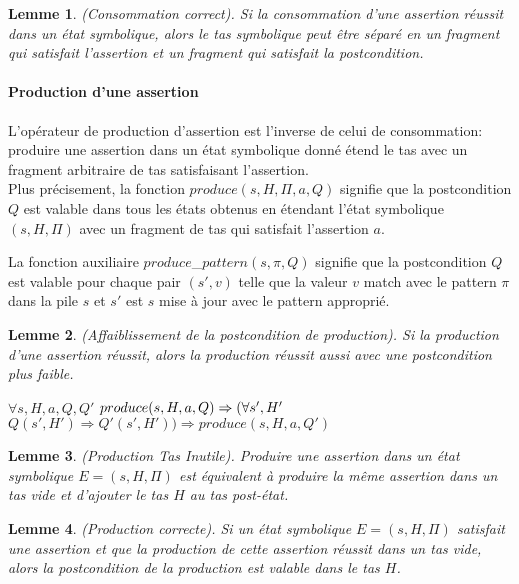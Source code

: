\documentclass[11pt,openany]{article}
\newtheorem{lemme}{Lemme}
\begin{document}
	\begin{lemme}
		(Consommation correct). Si la consommation d'une assertion r\'eussit dans un \'etat symbolique, alors le tas symbolique peut \^etre s\'epar\'e en un fragment qui satisfait l'assertion et un fragment qui satisfait la postcondition.
	\end{lemme}
			\paragraph{Production d'une assertion}
		L'op\'erateur de production d'assertion est l'inverse de celui de consommation: produire une assertion dans un \'etat symbolique donn\'e \'etend le tas avec un fragment arbitraire de tas satisfaisant l'assertion.\\
		Plus pr\'ecisement, la fonction $produce(s,H,\Pi,a,Q)$ signifie que la postcondition $Q$ est valable  dans tous les \'etats obtenus en \'etendant l'\'etat symbolique $(s, H, \Pi)$ avec un fragment de tas qui satisfait l'assertion $a$.
		
		La fonction auxiliaire $produce$_$pattern(s,\pi,Q)$ signifie que la postcondition $Q$ est valable pour chaque pair $(s',v)$ telle que la valeur $v$ match avec le pattern $\pi$ dans la pile $s$ et $s'$ est $s$ mise \`a jour avec le pattern appropri\'e.
		
		\begin{lemme}
			(Affaiblissement de la postcondition de production). Si la production d'une assertion r\'eussit, alors la production r\'eussit aussi avec une postcondition plus faible.
			
$\forall s,H,a,Q,Q'$ $produce(s,H,a,Q)\Rightarrow\\(\forall s', H'$ $Q(s',H')\Rightarrow Q'(s',H'))\Rightarrow produce(s,H,a,Q')$
		\end{lemme}	
		
		\begin{lemme}
		(Production Tas Inutile). Produire une assertion dans un \'etat symbolique $E = (s,H,\Pi)$  est \'equivalent \`a produire la m\^eme assertion dans un tas vide et d'ajouter le tas $H$ au tas post-\'etat.
		\end{lemme}
	
		\begin{lemme}
		(Production correcte). Si un \'etat symbolique $E=(s,H,\Pi)$ satisfait une assertion et que la production de cette assertion r\'eussit dans un tas vide, alors la postcondition de la production est valable dans le tas $H$.
		\end{lemme}
			
\end{document}
